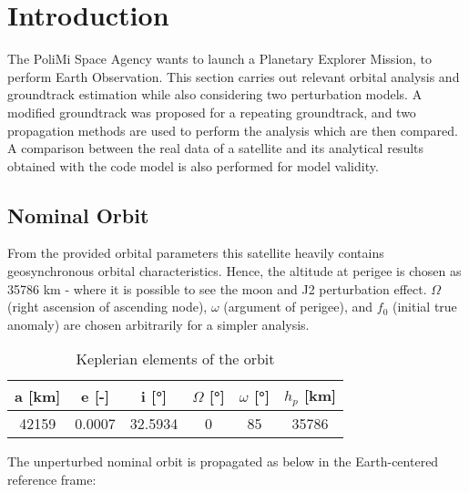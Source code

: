 \section{Introduction}
\label{sec:introduction_cap2}

The PoliMi Space Agency wants to launch a Planetary Explorer Mission, to  perform  Earth Observation. This section carries out relevant orbital analysis and groundtrack estimation while also considering two perturbation models. A modified groundtrack was proposed for a repeating groundtrack, and two propagation methods are used to perform the analysis which are then compared. A comparison between the real data of a satellite and its analytical results obtained with the code model is also performed for model validity.


\subsection{Nominal Orbit}

From the provided orbital parameters this satellite heavily contains geosynchronous orbital characteristics. Hence, the altitude at perigee is chosen as 35786 km \cite{perigee_alt} - where it is possible to see the moon and J2 perturbation effect. $\Omega$ (right ascension of ascending node), $\omega$ (argument of perigee), and $f_0$ (initial true anomaly) are chosen arbitrarily for a simpler analysis.


\begin{table}[ht]
	\centering
	\label{tab:keplerian_elements}
	\begin{tabular}{|c|c|c|c|c|c|}
		\hline
		a [km] & e [-] & i [°] & $\Omega$ [°] & $\omega$ [°] & $h_p$ [km] \\
		\hline
		42159 & 0.0007 & 32.5934 & 0 & 85 & 35786 \\
		\hline
	\end{tabular}
	\caption{Keplerian elements of the orbit}
\end{table}

The unperturbed nominal orbit is propagated as below in the Earth-centered reference frame:

